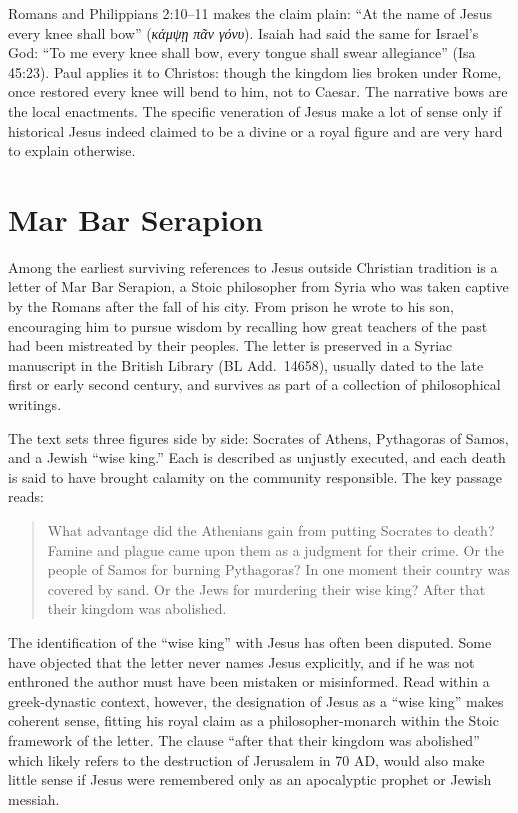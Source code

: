 Romans and Philippians 2:10--11 makes the claim plain: “At the name of Jesus every knee shall bow” (\emph{κάμψῃ πᾶν γόνυ}).
Isaiah had said the same for Israel’s God: “To me every knee shall bow, every tongue shall swear allegiance” (Isa 45:23).
Paul applies it to Christos: though the kingdom lies broken under Rome, once restored every knee will bend to him, not to Caesar.
The narrative bows are the local enactments.
The specific veneration of Jesus make a lot of sense only if historical Jesus indeed claimed to be a divine or a royal figure and are very hard to explain otherwise.

\section{Mar Bar Serapion}\label{sec:mar-bar-serapion}

Among the earliest surviving references to Jesus outside Christian tradition is a letter of Mar Bar Serapion, a Stoic philosopher from Syria who was taken captive by the Romans after the fall of his city.
From prison he wrote to his son, encouraging him to pursue wisdom by recalling how great teachers of the past had been mistreated by their peoples.
The letter is preserved in a Syriac manuscript in the British Library (BL Add.~14658), usually dated to the late first or early second century, and survives as part of a collection of philosophical writings.

The text sets three figures side by side: Socrates of Athens, Pythagoras of Samos, and a Jewish “wise king.”
Each is described as unjustly executed, and each death is said to have brought calamity on the community responsible.
The key passage reads:
\begin{quote}
    What advantage did the Athenians gain from putting Socrates to death?
    Famine and plague came upon them as a judgment for their crime.
    Or the people of Samos for burning Pythagoras?
    In one moment their country was covered by sand.
    Or the Jews for murdering their wise king?
    After that their kingdom was abolished.
\end{quote}

The identification of the “wise king” with Jesus has often been disputed.
Some have objected that the letter never names Jesus explicitly, and if he was not enthroned the author must have been mistaken or misinformed.
Read within a greek-dynastic context, however, the designation of Jesus as a “wise king” makes coherent sense, fitting his royal claim as a philosopher-monarch within the Stoic framework of the letter.
The clause “after that their kingdom was abolished” which likely refers to the destruction of Jerusalem in 70 AD, would also make little sense if Jesus were remembered only as an apocalyptic prophet or Jewish messiah.


